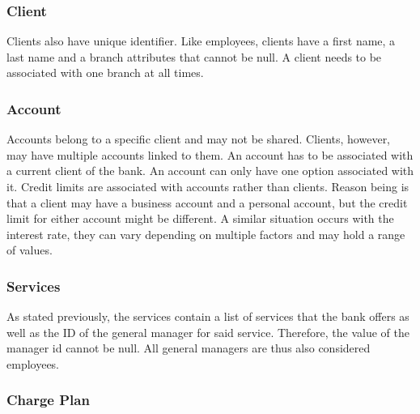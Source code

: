 \documentclass[letterpaper, 12pt]{article}
\begin{document}
\subsubsection{Client}
Clients also have unique identifier.
Like employees, clients have a first name, a last name and a branch attributes that cannot be null.
A client needs to be associated with one branch at all times.

\subsubsection{Account}
Accounts belong to a specific client and may not be shared.
Clients, however, may have multiple accounts linked to them.
An account has to be associated with a current client of the bank.
An account can only have one option associated with it.%
Credit limits are associated with accounts rather than clients.
Reason being is that a client may have a business account and a personal account, but the credit limit for either account might be different.
A similar situation occurs with the interest rate, they can vary depending on multiple factors and may hold a range of values.


\subsubsection{Services}
As stated previously, the services contain a list of services that the bank offers as well as the ID of the general manager for said service.
Therefore, the value of the manager id cannot be null. All general managers are thus also considered employees.

\subsubsection{Charge Plan}
\end{document}
